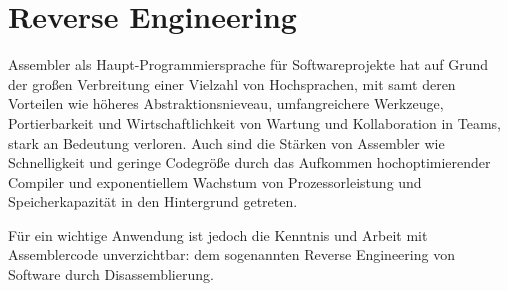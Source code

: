 \section{Reverse Engineering}

Assembler als Haupt-Programmiersprache für Softwareprojekte hat auf Grund der großen Verbreitung einer Vielzahl von Hochsprachen, mit samt deren Vorteilen wie höheres Abstraktionsnieveau, umfangreichere Werkzeuge, Portierbarkeit und Wirtschaftlichkeit von Wartung und Kollaboration in Teams, stark an Bedeutung verloren. Auch sind die Stärken von Assembler wie Schnelligkeit und geringe Codegröße durch das Aufkommen hochoptimierender Compiler und exponentiellem Wachstum von Prozessorleistung und Speicherkapazität in den Hintergrund getreten.

Für ein wichtige Anwendung ist jedoch die Kenntnis und Arbeit mit Assemblercode unverzichtbar: dem sogenannten Reverse Engineering von Software durch Disassemblierung.